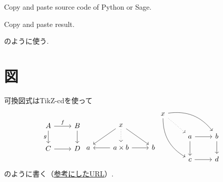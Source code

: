 \documentclass[11pt,a4paper,oneside,lualatex]{ltjsarticle} %
\begin{document}
\begin{Python}
Copy and paste source code of Python or Sage.
\end{Python}
\begin{result}
Copy and paste result.
\end{result}
のように使う.


\section{図} \label{sec:diag}


可換図式はTikZ-cdを使って
\[
\begin{tikzcd}
	A \ar[r, "f"] \arrow[d, "g"'] & B \ar[d] \\
	C \ar[r] & D
\end{tikzcd}
\begin{tikzcd}
	& x \arrow[ld] \arrow[d, dotted] \arrow[rd] & \\
	a & a\times b \arrow[l] \arrow[r] & b
\end{tikzcd}
\begin{tikzcd}
	x \arrow[ddr, bend right] \arrow[rrd, bend left] \arrow[rd, dotted] & & \\
	& a \arrow[r] \arrow[d] & b \arrow[d] \\
	& c \arrow[r] & d
\end{tikzcd}
\]
のように書く（\href{https://blog.miz-ar.info/2017/06/commutative-diagrams-in-latex/}{参考にしたURL}）.

%
\end{document}
